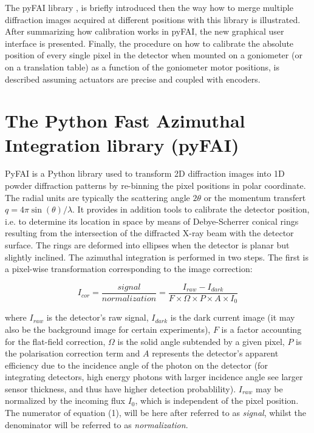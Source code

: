 \documentclass[preprint]{iucr}              %
\begin{document}
The pyFAI library \cite{fv5028}, is briefly introduced then the way how to
merge multiple diffraction images acquired at different positions with this
library \cite{PyFAI_PDJ} is illustrated. 
After summarizing how calibration works in pyFAI, the new graphical user
interface is presented.
Finally, the procedure on how to calibrate the absolute position of
every single pixel in the detector when mounted on a goniometer (or on a
translation table) as a function of the goniometer motor positions, is
described assuming actuators are precise and coupled with encoders. 

\section{The Python Fast Azimuthal Integration library (pyFAI)}

PyFAI is a Python \cite{python} library used to transform 2D diffraction images into
1D powder diffraction patterns by re-binning the pixel positions in polar
coordinate. 
The radial units are typically the scattering angle  
$2\theta$ or the momentum transfert $q=4\pi \sin(\theta)/\lambda$.
It provides in addition tools to calibrate the detector position, i.e.
to determine its location in space by means of Debye-Scherrer conical rings
resulting from the intersection of the diffracted X-ray beam with the
detector surface. 
The rings are deformed into ellipses when the detector is planar but 
slightly inclined. 
The azimuthal integration is performed in two steps. 
The first is a pixel-wise
transformation corresponding to the image correction:

\begin{equation}
I_{cor} = \frac{signal}{normalization}  = \frac{I_{raw} - I_{dark}}{F \times
\Omega \times P \times A \times I_0} 
\end{equation}

where $I_{raw}$ is the detector's raw signal, $I_{dark}$ is the dark current
image (it may also be the background image for certain experiments), $F$ is a 
factor accounting for the flat-field correction, $\Omega$ is the solid
angle subtended by a given pixel, $P$ is the polarisation correction term and
$A$ represents the detector's apparent efficiency due to the incidence angle of the
photon on the detector (for integrating detectors, high energy photons with
larger incidence angle see larger sensor thickness, and thus have higher
detection probablility).
$I_{raw}$ may be normalized by the incoming flux $I_0$, which is
independent of the pixel position.
The numerator of equation (1), will be here after referred to as
\textit{signal}, whilst the denominator will be referred to as
\textit{normalization}.
\end{document}
